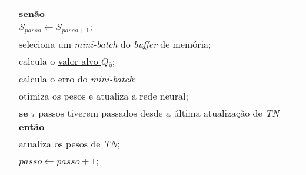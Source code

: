 \begin{tabular}{l l}
 & \qquad \qquad \textbf{senão}\\
 & \qquad \qquad \qquad $S_{passo} \leftarrow S_{passo+1};$ \\
 & \qquad \qquad seleciona um \textit{mini-batch} do \textit{buffer} de memória;\\
 & \qquad \qquad calcula o \hyperref[eq:q_target]{valor alvo $\overline{Q}_{\overline{\theta}}$};\\
 & \qquad \qquad calcula o erro do \textit{mini-batch};\\
 & \qquad \qquad otimiza os pesos e atualiza a rede neural;\\
 & \qquad \qquad \textbf{se} $\tau$ passos tiverem passados desde a última atualização de \textit{TN} \textbf{então}\\
 & \qquad \qquad \qquad atualiza os pesos de \textit{TN};\\
 & \qquad \qquad $passo \leftarrow passo + 1$;\\
\hline
\end{tabular}
